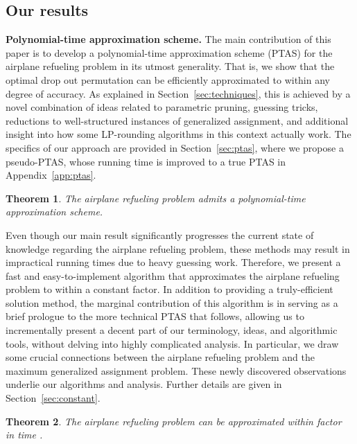 \documentclass[11pt]{article}
\theoremstyle{plain}
\newtheorem{theorem}{Theorem}[section]
\theoremstyle{definition}
\begin{document}
\subsection{Our results} \label{subsec:results}

{\bf Polynomial-time approximation scheme.} The main contribution of this paper is to develop a polynomial-time approximation scheme (PTAS) for the airplane refueling problem in its utmost generality. That is, we show that the optimal drop out permutation can be efficiently approximated to within any degree of accuracy. As explained in Section~\ref{sec:techniques}, this is achieved by a novel combination of ideas related to parametric pruning, guessing tricks, reductions to well-structured instances of generalized assignment, and additional insight into how some LP-rounding algorithms in this context actually work. The specifics of our approach are provided in Section~\ref{sec:ptas}, where we propose a pseudo-PTAS, whose running time is improved to a true PTAS in Appendix~\ref{app:ptas}.

\begin{theorem} \label{thm:ptas}
The airplane refueling problem admits a polynomial-time approximation scheme.
\end{theorem}

 Even though our main result significantly progresses the current state of knowledge regarding the airplane refueling problem, these methods may result in impractical running times due to heavy guessing work. Therefore, we present a fast and easy-to-implement algorithm that approximates the airplane refueling problem to within a constant factor. In addition to providing a truly-efficient solution method, the marginal contribution of this algorithm is in serving as a brief prologue to the more technical PTAS that follows, allowing us to incrementally present a decent part of our terminology, ideas, and algorithmic tools, without delving into highly complicated analysis. In particular, we 
draw some crucial connections between the airplane refueling problem and the maximum generalized assignment problem. These newly discovered observations underlie our algorithms and analysis. Further details are given in Section~\ref{sec:constant}.

\begin{theorem} \label{thm:constant_approx}
The airplane refueling problem can be approximated within factor~ in time .
\end{theorem}
\end{document}
